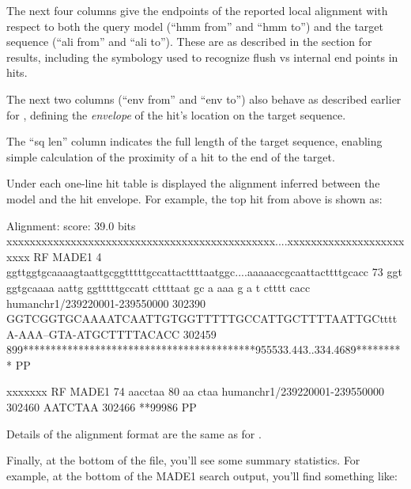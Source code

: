 The next four columns give the endpoints of the reported local
alignment with respect to both the query model (``hmm from'' and ``hmm
to'') and the target sequence (``ali from'' and ``ali to''). These are as
described in the section for  results, including the symbology
used to recognize flush vs internal end points in hits. 

The next two columns (``env from'' and ``env to'') also behave as
described earlier for , defining the \emph{envelope} of the
hit's location on the target sequence.  

The ``sq len'' column indicates the full length of the target sequence, enabling
simple calculation of the proximity of a hit to the end of the target.

Under each one-line hit table is displayed the alignment inferred between the
model and the hit envelope. For example, the top hit from above is shown as:

\begin{samepage}
\begin{sreoutput}
  Alignment:
  score: 39.0 bits
                                       xxxxxxxxxxxxxxxxxxxxxxxxxxxxxxxxxxxxxxxxxxxxxx....xxxxxxxxxxxxxxxxxxxxxxxx RF
                          MADE1      4 ggttggtgcaaaagtaattgcggtttttgccattacttttaatggc....aaaaaccgcaattacttttgcacc 73
                                       ggt ggtgcaaaa  aattg ggtttttgccatt cttttaat gc    a aaa  g a  t ctttt cacc
  humanchr1/239220001-239550000 302390 GGTCGGTGCAAAATCAATTGTGGTTTTTGCCATTGCTTTTAATTGCttttA-AAA--GTA-ATGCTTTTACACC 302459
                                       899******************************************955533.443..334.4689********* PP

                                       xxxxxxx RF
                          MADE1     74 aacctaa 80
                                       aa ctaa
  humanchr1/239220001-239550000 302460 AATCTAA 302466
                                       **99986 PP                                       
\end{sreoutput}
\end{samepage}

Details of the alignment format are the same as for .


Finally, at the bottom of the file, you'll see some summary
statistics.  For example, at the bottom of the MADE1 search output,
you'll find something like:


